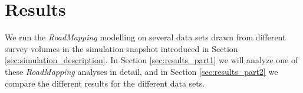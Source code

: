 \documentclass[iop,revtex4,numberedappendix,appendixfloats]{emulateapj}
\newcommand{\RM}{{\sl RoadMapping}}
\begin{document}
\section{Results} \label{sec:results}

We run the \RM{} modelling on several data sets drawn from different survey volumes in the simulation snapshot introduced in Section \ref{sec:simulation_description}. In Section \ref{sec:results_part1} we will analyze one of these \RM{} analyses in detail, and in Section \ref{sec:results_part2} we compare the different results for the different data sets.

\begin{figure}[!htbp]
  \centering

\end{figure}
\end{document}
